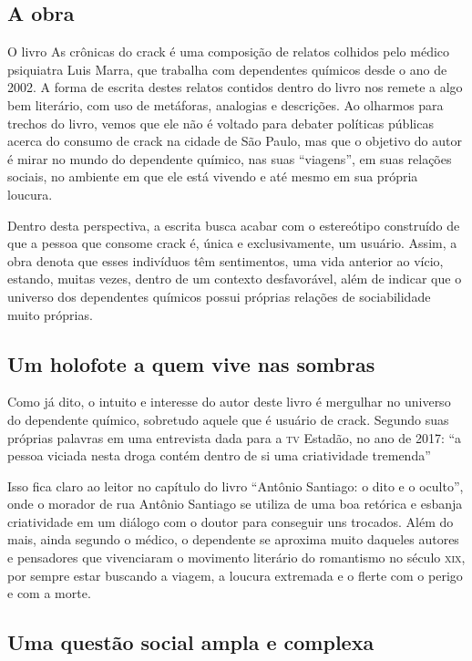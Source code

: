 \documentclass{article}
\begin{document}
\subsection{A obra}

O livro As crônicas do crack é uma composição de relatos colhidos
pelo médico psiquiatra Luis Marra, que trabalha com dependentes químicos
desde o ano de 2002. A forma de escrita destes relatos contidos dentro
do livro nos remete a algo bem literário, com uso de metáforas,
analogias e descrições. Ao olharmos para trechos do livro, vemos que ele
não é voltado para debater políticas públicas acerca do consumo de crack
na cidade de São Paulo, mas que o objetivo do autor é mirar no mundo do
dependente químico, nas suas ``viagens'', em suas relações sociais, no
ambiente em que ele está vivendo e até mesmo em sua própria loucura.

Dentro desta perspectiva, a escrita busca acabar com o estereótipo
construído de que a pessoa que consome crack é, única e exclusivamente,
um usuário. Assim, a obra denota que esses indivíduos têm sentimentos,
uma vida anterior ao vício, estando, muitas vezes, dentro de um contexto
desfavorável, além de indicar que o universo dos dependentes químicos
possui próprias relações de sociabilidade muito próprias.

\subsection{Um holofote a quem vive nas sombras}

Como já dito, o intuito e interesse do autor deste livro é mergulhar no
universo do dependente químico, sobretudo aquele que é usuário de crack.
Segundo suas próprias palavras em uma entrevista dada para a \textsc{tv} Estadão,
no ano de 2017: ``a pessoa viciada nesta droga contém dentro de si uma
criatividade tremenda''

Isso fica claro ao leitor no capítulo do livro ``Antônio Santiago: o
dito e o oculto'', onde o morador de rua Antônio Santiago se utiliza de
uma boa retórica e esbanja criatividade em um diálogo com o doutor para
conseguir uns trocados. Além do mais, ainda segundo o médico, o
dependente se aproxima muito daqueles autores e pensadores que
vivenciaram o movimento literário do romantismo no século \textsc{xix}, por
sempre estar buscando a viagem, a loucura extremada e o flerte com o
perigo e com a morte.

\subsection{Uma questão social ampla e complexa}
\end{document}
